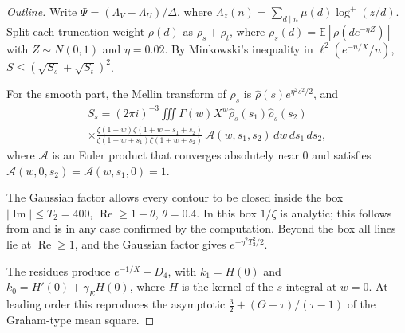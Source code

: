 \documentclass[11pt]{amsart}
\numberwithin{equation}{section}
\theoremstyle{definition}
\theoremstyle{remark}
\newcommand{\Rp}{\operatorname{Re}}
\newcommand{\Ip}{\operatorname{Im}}
\begin{document}
\begin{proof}[Outline]
Write $\Psi = (\Lambda_V - \Lambda_U)/\Delta$, where $\Lambda_z(n) = \sum_{d\mid n}\mu(d)\log^+(z/d)$.
Split each truncation weight $\rho(d)$ as $\rho_s + \rho_t$, where $\rho_s(d) = \mathbb E[\rho(de^{-\eta Z})]$ with $Z\sim N(0,1)$ and $\eta = 0.02$.
By Minkowski's inequality in $\ell^2(e^{-n/X}/n)$, $S \le (\sqrt{S_s}+\sqrt{S_t})^2$.

For the smooth part, the Mellin transform of $\rho_s$ is $\hat\rho(s)e^{\eta^2s^2/2}$, and
\begin{multline*}
S_s = (2\pi i)^{-3}\iiint\Gamma(w)X^w\hat\rho_s(s_1)\hat\rho_s(s_2)\\ \times\frac{\zeta(1+w)\zeta(1+w+s_1+s_2)}{\zeta(1+w+s_1)\zeta(1+w+s_2)}\,\mathcal A(w,s_1,s_2)\,dw\,ds_1\,ds_2,
\end{multline*}
where $\mathcal A$ is an Euler product that converges absolutely near $0$ and satisfies $\mathcal A(w,0,s_2) = \mathcal A(w,s_1,0) = 1$.

The Gaussian factor allows every contour to be closed inside the box $|\Ip| \le T_2 = 400$, $\Rp \ge 1-\theta$, $\theta = 0.4$.
In this box $1/\zeta$ is analytic; this follows from \cite{PlattTrudgianRH} and is in any case confirmed by the computation.
Beyond the box all lines lie at $\Rp\ge1$, and the Gaussian factor gives $e^{-\eta^2T_2^2/2}$.

The residues produce $e^{-1/X} + D_4$, with $k_1 = H(0)$ and $k_0 = H'(0) + \gamma_EH(0)$, where $H$ is the kernel of the $s$-integral at $w = 0$.
At leading order this reproduces the asymptotic $\frac32 + (\Theta - \tau)/(\tau-1)$ of the Graham-type mean square.


\end{proof}
\end{document}
